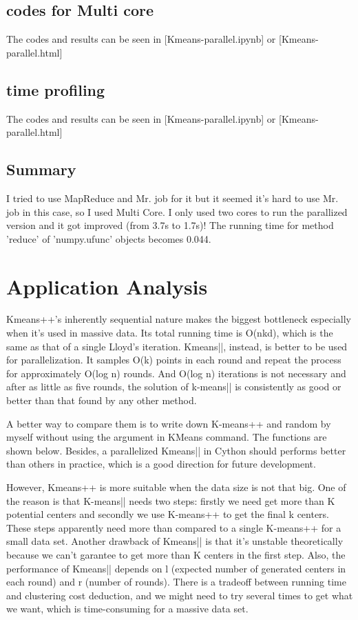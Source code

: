 \documentclass{article}
\begin{document}
\subsection{codes for Multi core}
The codes and results can be seen in [Kmeans-parallel.ipynb] or [Kmeans-parallel.html]
\subsection{time profiling}
The codes and results can be seen in [Kmeans-parallel.ipynb] or [Kmeans-parallel.html]
\subsection{Summary}
I tried to use MapReduce and Mr. job for it but it seemed it's hard to use Mr. job in this case, so I used Multi Core. I only used two cores to run the parallized version and it got improved (from 3.7s to 1.7s)! The running time for {method 'reduce' of 'numpy.ufunc' objects} becomes 0.044.
\section{Application Analysis}
Kmeans++'s inherently sequential nature makes the biggest bottleneck especially when it's used in massive data. Its total running time is O(nkd), which is the same as that of a single Lloyd’s iteration. Kmeans||, instead, is better to be used for parallelization. It samples O(k) points in each round and repeat the process for approximately O(log n) rounds. And O(log n) iterations is not necessary and after as little as five rounds, the solution of k-means|| is consistently as good or better than that found by any other method.

\vspace{2 mm}
A better way to compare them is to write down K-means++ and random by myself without using the argument in KMeans command. The functions are shown below. Besides, a parallelized Kmeans|| in Cython should performs better than others in practice, which is a good direction for future development. 

\vspace{2 mm}
However, Kmeans++ is more suitable when the data size is not that big. One of the reason is that K-means|| needs two steps: firstly we need get more than K potential centers and secondly we use K-means++ to get the final k centers. These steps apparently need more than compared to a single K-means++ for a small data set. Another drawback of Kmeans|| is that it's unstable theoretically because we can't garantee to get more than K centers in the first step. Also, the performance of Kmeans|| depends on l (expected number of generated centers in each round) and r (number of rounds). There is a tradeoff between running time and clustering cost deduction, and we might need to try several times to get what we want, which is time-consuming for a massive data set.
\end{document}
